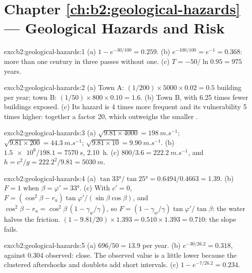\section*{Chapter \ref{ch:b2:geological-hazards} --- Geological Hazards and Risk}

\begin{solution}{exo:b2:geological-hazards:1}
(a) $1 - e^{-30/100} = 0.259$. (b) $e^{-100/100} = e^{-1} = 0.368$: more than one century in three
passes without one. (c) $T = -50/\ln 0.95 = 975$ years.
\end{solution}

\begin{solution}{exo:b2:geological-hazards:2}
(a) Town A: $(1/200) \times 5000 \times 0.02 = 0.5$ building per year; town B: $(1/50) \times 800
\times 0.10 = 1.6$. (b) Town B, with 6.25 times fewer buildings exposed. (c) Its hazard is 4 times
more frequent and its vulnerability 5 times higher: together a factor 20, which outweighs the
smaller .
\end{solution}

\begin{solution}{exo:b2:geological-hazards:3}
(a) $\sqrt{9.81 \times 4000} = \qty{198}{m.s^{-1}}$; $\sqrt{9.81 \times 200} = \qty{44.3}{m.s^{-1}}$;
$\sqrt{9.81 \times 10} = \qty{9.90}{m.s^{-1}}$. (b) $\num{1.5e6}/198.1 = \qty{7570}{s}$, \qty{2.10}{h}.
(c) $800/3.6 = \qty{222.2}{m.s^{-1}}$, and $h = c^2/g = 222.2^2/9.81 = \qty{5030}{m}$.
\end{solution}

\begin{solution}{exo:b2:geological-hazards:4}
(a) $\tan\ang{33}/\tan\ang{25} = 0.6494/0.4663 = 1.39$. (b) $F = 1$ when $\beta = \varphi' =
\ang{33}$. (c) With $c' = 0$, $F = (\cos^2\beta - r_u)\tan\varphi'/(\sin\beta\cos\beta)$, and $\cos^2\beta
- r_u = \cos^2\beta\,(1 - \gamma_w/\gamma)$, so $F = (1 - \gamma_w/\gamma)\tan\varphi'/\tan\beta$:
the water halves the friction. $(1 - 9.81/20) \times 1.393 = 0.510 \times 1.393 = 0.710$: the
slope fails.
\end{solution}

\begin{solution}{exo:b2:geological-hazards:5}
(a) $696/50 = 13.9$ per year. (b) $e^{-30/26.2} = 0.318$, against 0.304 observed: close. The
observed value is a little lower because the clustered aftershocks and doublets add short
intervals. (c) $1 - e^{-7/26.2} = 0.234$.
\end{solution}

